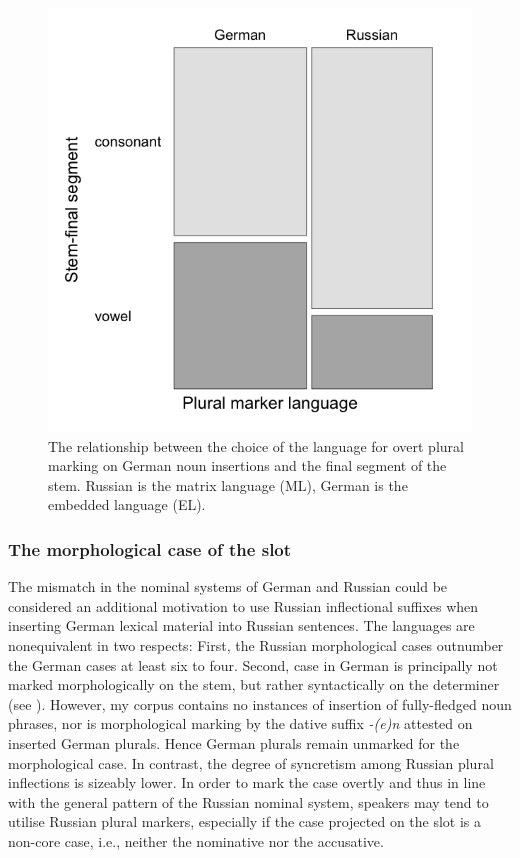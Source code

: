 \begin{figure}
\includegraphics[scale=0.3]{figures/6-Figure_3.png}	
\caption{The relationship between the choice of the language for overt plural marking on German noun insertions and the final segment of the stem. Russian is the matrix language (ML), German is the embedded language (EL).\label{fig:6:3}}
\end{figure}

\subsubsection{The morphological case of the slot}

The mismatch in the nominal systems of German and Russian could be considered an additional motivation to use Russian inflectional suffixes when inserting German lexical material into Russian sentences. The  languages are nonequivalent in two respects: First, the Russian morphological cases outnumber the German cases at least six to four. Second, case in German is principally not marked morphologically on the stem, but rather syntactically on the determiner (see ). However, my corpus contains no instances of insertion of fully-fledged noun phrases, nor is morphological marking by the dative suffix \textit{-(e)n} attested on inserted German plurals. Hence German plurals remain unmarked for the morphological case. In contrast, the degree of syncretism among Russian plural inflections is sizeably lower. In order to mark the case overtly and thus in line with the general pattern of the Russian nominal system, speakers may tend to utilise Russian plural markers, especially if the case projected on the slot is a non-core case, i.e., neither the nominative nor the accusative.

